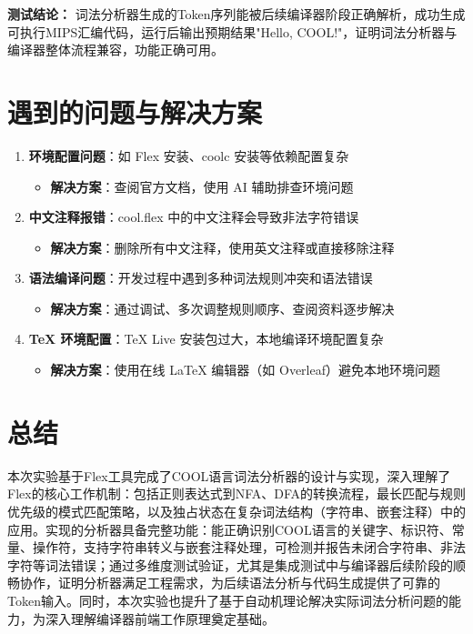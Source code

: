 \documentclass[twocolumn]{article}
\begin{document}
\textbf{测试结论：} 词法分析器生成的Token序列能被后续编译器阶段正确解析，成功生成可执行MIPS汇编代码，运行后输出预期结果"Hello, COOL!"，证明词法分析器与编译器整体流程兼容，功能正确可用。

\section{遇到的问题与解决方案}
\begin{enumerate}
    \item \textbf{环境配置问题}：如 Flex 安装、coolc 安装等依赖配置复杂
    \begin{itemize}
        \item \textbf{解决方案}：查阅官方文档，使用 AI 辅助排查环境问题
    \end{itemize}
    
    \item \textbf{中文注释报错}：cool.flex 中的中文注释会导致非法字符错误
    \begin{itemize}
        \item \textbf{解决方案}：删除所有中文注释，使用英文注释或直接移除注释
    \end{itemize}
    
    \item \textbf{语法编译问题}：开发过程中遇到多种词法规则冲突和语法错误
    \begin{itemize}
        \item \textbf{解决方案}：通过调试、多次调整规则顺序、查阅资料逐步解决
    \end{itemize}
    
    \item \textbf{TeX 环境配置}：TeX Live 安装包过大，本地编译环境配置复杂
    \begin{itemize}
        \item \textbf{解决方案}：使用在线 LaTeX 编辑器（如 Overleaf）避免本地环境问题
    \end{itemize}
\end{enumerate}

\section{总结}

本次实验基于Flex工具完成了COOL语言词法分析器的设计与实现，深入理解了Flex的核心工作机制：包括正则表达式到NFA、DFA的转换流程，最长匹配与规则优先级的模式匹配策略，以及独占状态在复杂词法结构（字符串、嵌套注释）中的应用。实现的分析器具备完整功能：能正确识别COOL语言的关键字、标识符、常量、操作符，支持字符串转义与嵌套注释处理，可检测并报告未闭合字符串、非法字符等词法错误；通过多维度测试验证，尤其是集成测试中与编译器后续阶段的顺畅协作，证明分析器满足工程需求，为后续语法分析与代码生成提供了可靠的Token输入。同时，本次实验也提升了基于自动机理论解决实际词法分析问题的能力，为深入理解编译器前端工作原理奠定基础。
\end{document}
